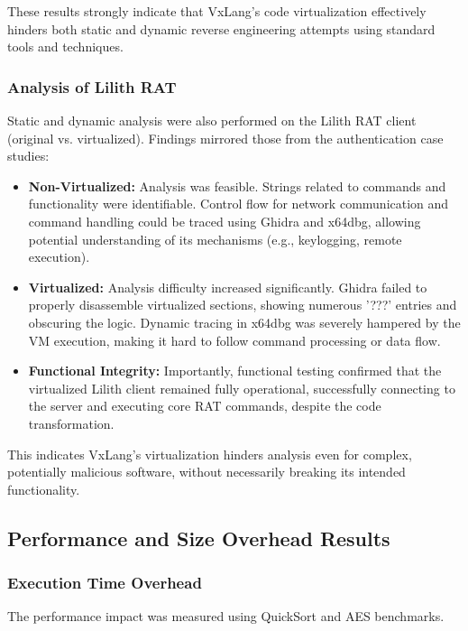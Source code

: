 These results strongly indicate that VxLang's code virtualization effectively hinders both static and dynamic reverse engineering attempts using standard tools and techniques.

\subsubsection{Analysis of Lilith RAT}
Static and dynamic analysis were also performed on the Lilith RAT client (original vs. virtualized). Findings mirrored those from the authentication case studies:
\begin{itemize}
	\item \textbf{Non-Virtualized:} Analysis was feasible. Strings related to commands and functionality were identifiable. Control flow for network communication and command handling could be traced using Ghidra and x64dbg, allowing potential understanding of its mechanisms (e.g., keylogging, remote execution).
	\item \textbf{Virtualized:} Analysis difficulty increased significantly. Ghidra failed to properly disassemble virtualized sections, showing numerous '???' entries and obscuring the logic. Dynamic tracing in x64dbg was severely hampered by the VM execution, making it hard to follow command processing or data flow.
	\item \textbf{Functional Integrity:} Importantly, functional testing confirmed that the virtualized Lilith client remained fully operational, successfully connecting to the server and executing core RAT commands, despite the code transformation.
\end{itemize}
This indicates VxLang's virtualization hinders analysis even for complex, potentially malicious software, without necessarily breaking its intended functionality.
\subsection{Performance and Size Overhead Results}

\subsubsection{Execution Time Overhead}
The performance impact was measured using QuickSort and AES benchmarks.

